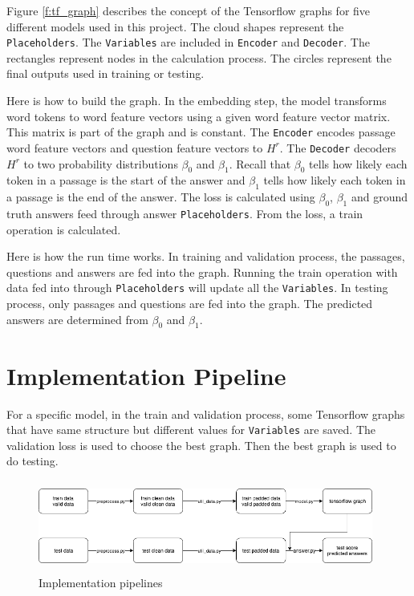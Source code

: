\documentclass[modernstyle,12pt]{sjsuthesis}
\theoremstyle{definition}
\begin{document}
Figure \ref{f:tf_graph} describes the concept of the Tensorflow graphs for five different models used in this project. The cloud shapes represent the {\tt Placeholders}. The {\tt Variables} are included in {\tt Encoder} and {\tt Decoder}. The rectangles represent nodes in the calculation process. The circles represent the final outputs used in training or testing.

Here is how to build the graph. In the embedding step, the model transforms word tokens to word feature vectors using a given word feature vector matrix. This matrix is part of the graph and is constant. The {\tt Encoder} encodes passage word feature vectors and question feature vectors to $H^r$. The {\tt Decoder} decoders $H^r$ to two probability distributions $\beta _0$ and $\beta _1$. Recall that $\beta _0$ tells how likely each token in a passage is the start of the answer and $\beta _1$ tells how likely each token in a passage is the end of the answer. The loss is calculated using $\beta _0$, $\beta _1$ and ground truth answers feed through answer {\tt Placeholders}. From the loss, a train operation is calculated.

Here is how the run time works. In training and validation process, the passages, questions and answers are fed into the graph. Running the train operation with data fed into through {\tt Placeholders} will update all the {\tt Variables}. In testing process, only passages and questions are fed into the graph. The predicted answers are determined from $\beta _0$ and $\beta _1$.






\section{Implementation Pipeline}

For a specific model, in the train and validation process, some Tensorflow graphs that have same structure but different values for {\tt Variables} are saved. The validation loss is used to choose the best graph. Then the best graph is used to do testing.

\begin{figure}[htbp]\centering
  \includegraphics[width=11cm, height=3cm]{figures/pipeline.png}
  \caption{Implementation pipelines}
  \label{f:pipeline}
\end{figure}
\end{document}
